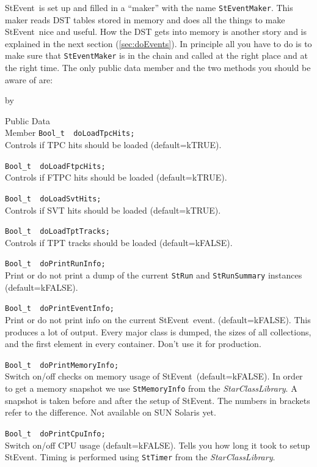 \documentclass[twoside]{article}
\newcommand{\name}[1]{\textsl{#1}}%
\newcommand{\StEvent}{\textsf{StEvent}}
\newcommand{\entrylabel}[1]{\mbox{\textbf{{#1}}}\hfil}%
\newenvironment{entry}
{\begin{list}{}%
    {\renewcommand{\makelabel}{\entrylabel}%
     \setlength{\labelwidth}{90pt}%
     \setlength{\leftmargin}{\labelwidth}
     \advance\leftmargin by \labelsep%
      }%
    }%
  {\end{list}}
\newcommand{\Entrylabel}[1]%
{\raisebox{0pt}[1ex][0pt]{\makebox[\labelwidth][l]%
    {\parbox[t]{\labelwidth}{\hspace{0pt}\textbf{{#1}}}}}}
\newenvironment{Entry}%
{\renewcommand{\entrylabel}{\Entrylabel}\begin{entry}}%
  {\end{entry}}
\begin{document}
\StEvent\ is set up and filled in a ``maker'' with the name
\texttt{StEventMaker}.  This maker reads DST tables stored in memory
and does all the things to make \StEvent\ nice and useful. How the DST
gets into memory is another story and is explained in the next section
(\ref{sec:doEvents}).  In principle all you have to do is to make sure
that \texttt{StEventMaker} is in the chain and called at the right
place and at the right time.  The only public data member and the two
methods you should be aware of are:
\begin{Entry}
    
\item[Public Data\\ Member]
    \verb+Bool_t  doLoadTpcHits;+\\
    Controls if TPC hits should be loaded (default=kTRUE).
    
    \verb+Bool_t  doLoadFtpcHits;+\\
    Controls if FTPC hits should be loaded (default=kTRUE).
    
    \verb+Bool_t  doLoadSvtHits; +\\
    Controls if SVT hits should be loaded (default=kTRUE).
                              
    \verb+Bool_t  doLoadTptTracks;+\\
    Controls if TPT tracks should be loaded (default=kFALSE).

\verb+Bool_t  doPrintRunInfo;+\\
    Print or do not print a dump of the current \texttt{StRun} and
    \texttt{StRunSummary} instances (default=kFALSE).
    
    \verb+Bool_t  doPrintEventInfo;+\\
    Print or do not print info on the current \StEvent\ event.
    (default=kFALSE).  This produces a lot of output. Every major
    class is dumped, the sizes of all collections, and the first
    element in every container. Don't use it for production.
    
    \verb+Bool_t  doPrintMemoryInfo;+\\
    Switch on/off checks on memory usage of \StEvent\
    (default=kFALSE).  In order to get a memory snapshot we use
    \texttt{StMemoryInfo} from the \name{StarClassLibrary}.  A
    snapshot is taken before and after the setup of \StEvent.  The
    numbers in brackets refer to the difference. Not available on SUN
    Solaris yet.
    
    \verb+Bool_t  doPrintCpuInfo;+\\
    Switch on/off CPU usage (default=kFALSE). Tells you how long it
    took to setup \StEvent. Timing is performed using \texttt{StTimer}
    from the \name{StarClassLibrary}.
    

\end{Entry}
\end{document}

